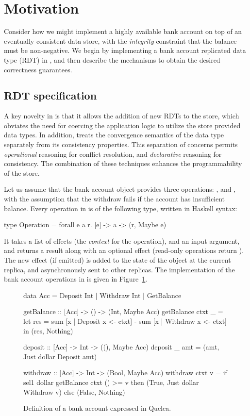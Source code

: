 \section{Motivation}
\label{sec:motivation}

Consider how we might implement a highly available bank account on top of an
eventually consistent data store, with the \emph{integrity} constraint that the
balance must be non-negative. We begin by implementing a bank account
replicated data type (RDT) in \name, and then describe the mechanisms to obtain
the desired correctness guarantees.

\subsection{RDT specification}

A key novelty in \name is that it allows the addition of new RDTs to the store,
which obviates the need for coercing the application logic to utilize the store
provided data types. In addition, \name treats the convergence semantics of the
data type separately from its consistency properties. This separation of
concerns permits \emph{operational} reasoning for conflict resolution, and
\emph{declarative} reasoning for consistency. The combination of these
techniques enhances the programmability of the store.

Let us assume that the bank account object provides three operations:
,  and , with the assumption that the
withdraw fails if the account has insufficient balance. Every operation in
\name is of the following type, written in Haskell syntax:

\begin{codehaskell}
type Operation = forall e a r. [e] -> a -> (r, Maybe e)
\end{codehaskell}

\noindent It takes a list of effects (the \emph{context} for the operation),
and an input argument, and returns a result along with an optional effect
(read-only operations return ). The new effect (if emitted) is
added to the state of the object at the current replica, and asynchronously
sent to other replicas. The implementation of the bank account operations in
\name is given in Figure~\ref{fig:ex}.

\begin{figure}
\begin{codehaskell}
data Acc = Deposit Int | Withdraw Int
				 | GetBalance

getBalance :: [Acc] -> () -> (Int, Maybe Acc)
getBalance ctxt _ =
  let res = sum [x | Deposit x <- ctxt]
						- sum [x | Withdraw x <- ctxt]
	in (res, Nothing)

deposit :: [Acc] -> Int -> ((), Maybe Acc)
deposit _ amt = (amt, Just dollar Deposit amt)

withdraw :: [Acc] -> Int -> (Bool, Maybe Acc)
withdraw ctxt v =
	if sel1 dollar getBalance ctxt () >= v
  then (True, Just dollar Withdraw v)
	else (False, Nothing)
\end{codehaskell}
\caption{Definition of a bank account expressed in Quelea.}
\label{fig:ex}
\end{figure}

